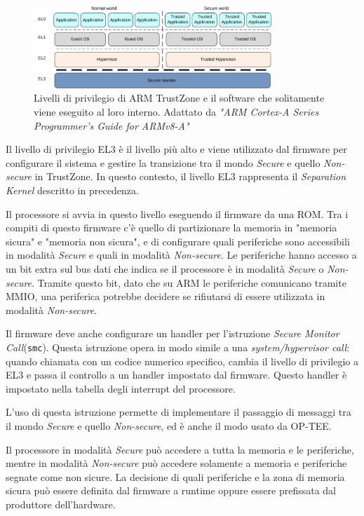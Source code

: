 \documentclass[12pt,italian]{report}
\begin{document}
\begin{figure}[h]
    \centering
    \includegraphics[width=0.8\textwidth]{immagini/aarch64-exception-levels}
    \caption{
        Livelli di privilegio di ARM TrustZone e il software
        che solitamente viene eseguito al loro interno.
        Adattato da
        \textit{"ARM Cortex-A Series Programmer's Guide for ARMv8-A"}
        \cite{arm_programmers_manual}
    }
    \label{fig:arm-exception-levels}
\end{figure}

Il livello di privilegio EL3 è il livello più alto e viene utilizzato
dal firmware per configurare il sistema e gestire la transizione
tra il mondo \emph{Secure} e quello \emph{Non-secure} in TrustZone.
In questo contesto, il livello EL3 rappresenta il
\emph{Separation Kernel} descritto in precedenza.

Il processore si avvia in questo livello eseguendo il firmware da una ROM.
Tra i compiti di questo firmware c'è quello di partizionare la memoria in
"memoria sicura" e "memoria non sicura", e di configurare quali
periferiche sono accessibili in modalità \emph{Secure} e quali
in modalità \emph{Non-secure}.
Le periferiche hanno accesso a un bit extra sul bus dati che
indica se il processore è in modalità \emph{Secure} o
\emph{Non-secure}.
Tramite questo bit, dato che su ARM le periferiche comunicano tramite MMIO,
una periferica potrebbe decidere se rifiutarsi di essere utilizzata
in modalità \emph{Non-secure}. 

Il firmware deve anche configurare un handler per l'istruzione
\textit{Secure Monitor Call}(\texttt{smc}).
Questa istruzione opera in modo simile a una \textit{system/hypervisor call}:
quando chiamata con un codice numerico specifico, cambia il livello
di privilegio a EL3 e passa il controllo a un handler impostato dal firmware.
Questo handler è impostato nella tabella degli interrupt del processore.

L'uso di questa istruzione permette di implementare il passaggio
di messaggi tra il mondo \emph{Secure} e quello \emph{Non-secure}, ed è
anche il modo usato da OP-TEE.

Il processore in modalità \emph{Secure} può accedere a tutta la memoria
e le periferiche, mentre in modalità \emph{Non-secure} può accedere
solamente a memoria e periferiche segnate come non sicure.
La decisione di quali periferiche e la zona di memoria sicura può essere
definita dal firmware a runtime oppure essere prefissata dal produttore
dell'hardware.
\end{document}
